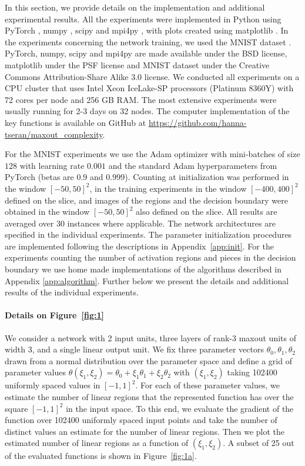 \documentclass{article}
\theoremstyle{definition}
\begin{document}
In this section, we provide details on the implementation and additional experimental results. 
All the experiments were implemented in Python using PyTorch \citep{NEURIPS2019_9015}, numpy \citep{harris2020array}, scipy \citep{scipy} and mpi4py \citep{dalcin2011parallel}, with plots created using matplotlib \citep{Hunter:2007}. 
In the experiments concerning the network training, we used the MNIST dataset \citep{lecun2010mnist}.
PyTorch, numpy, scipy and mpi4py are made available under the BSD license, matplotlib under the PSF license and MNIST dataset under the Creative Commons Attribution-Share Alike 3.0 license.
We conducted all experiments on a CPU cluster that uses Intel Xeon IceLake-SP processors (Platinum 8360Y) with 72 cores per node and 256 GB RAM. The most extensive experiments were usually running for 2-3 days on 32 nodes.
The computer implementation of the key functions is available on GitHub at \url{https://github.com/hanna-tseran/maxout_complexity}. 

For the MNIST experiments we use the Adam optimizer with mini-batches of size $128$ with learning rate $0.001$ and the standard Adam hyperparameters from PyTorch (betas are $0.9$ and $0.999$).
Counting at initialization was performed in the window $[-50, 50]^2$, in the training experiments in the window $[-400, 400]^2$ defined on the slice, and images of the regions and the decision boundary were obtained in the window $[-50, 50]^2$ also defined on the slice.
All results are averaged over 30 instances where applicable. 
The network architectures are specified in the individual experiments.
The parameter initialization procedures are implemented
following the descriptions in Appendix~\ref{app:init}. 
For the experiments counting the number of activation regions and pieces in the decision boundary we use home made implementations of the algorithms described in Appendix \ref{app:algorithm}. 
Further below we present the details and additional results of the individual experiments. 

\paragraph{Details on Figure~\ref{fig:1}} 
We consider a network with 2 input units, three layers of rank-3 maxout units of width 3, and a single linear output unit. 
We fix three parameter vectors $\theta_0,\theta_1,\theta_2$ drawn from a normal distribution over the parameter space and define a grid of parameter values $\theta(\xi_1,\xi_2) = \theta_0 + \xi_1\theta_1 + \xi_2\theta_2$ with $(\xi_1,\xi_2)$ taking 102400 uniformly spaced values in $[-1,1]^2$. 
For each of these parameter values, we estimate the number of linear regions that the represented function has over the square $[-1,1]^2$ in the input space. 
To this end, we evaluate the gradient of the function over 102400 uniformly spaced input points and take the number of distinct values an estimate for the number of linear regions.
Then we plot the estimated number of linear regions as a function of $(\xi_1,\xi_2)$. 
A subset of 25 out of the evaluated functions is shown in Figure~\ref{fig:1a}. 
    
\end{document}
